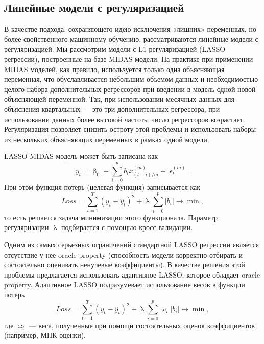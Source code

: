 \documentclass[a4paper, 12pt]{extarticle}
\numberwithin{equation}{subsection}
\renewcommand{\beta}{\upbeta}
\renewcommand{\lambda}{\uplambda}
\renewcommand{\omega}{\upomega}
\renewcommand{\epsilon}{\upvarepsilon}
\begin{document}
	\subsection{Линейные модели с регуляризацией}
	В качестве подхода, сохраняющего идею исключения «лишних» переменных, но более
	свойственного машинному обучению, рассматриваются линейные модели с регуляризацией.
	Мы рассмотрим модели с L1 регуляризацией (LASSO регрессии), построенные на базе MIDAS модели. На практике при применении
	MIDAS моделей, как правило, используется только одна объясняющая переменная, что обуславливается небольшим объемом данных и необходимостью целого набора дополнительных регрессоров при введении в модель одной новой объясняющей переменной. Так, при
	использовании месячных данных для объяснения квартальных --- это три дополнительных
	регрессора, при использовании данных более высокой частоты число регрессоров возрастает. Регуляризация позволяет снизить остроту этой проблемы и использовать наборы из нескольких объясняющих переменных в рамках одной модели.
	
	LASSO-MIDAS модель может быть записана как
	\begin{equation}
		y_t = \beta_0 + \sum_{i=0}^{p} b_i x_{(t-i)/m}^{(m)} + \epsilon_t^{(m)}.
	\end{equation}
	При этом функция потерь (целевая функция) записывается как \begin{equation}
		Loss = \sum_{t=1}^{T}(y_t - \hat{y}_t)^2 +\lambda \sum_{i=0}^{p}|b_i| \to \min,
	\end{equation}
	то есть решается задача минимизации этого функционала.
	Параметр регуляризации $\lambda$ подбирается с помощью кросс-валидации.
	
	Одним из самых серьезных ограничений стандартной LASSO регрессии является отсутствие у нее oracle property (способность модели корректно отбирать и состоятельно оценивать ненулевые коэффициенты). В качестве решения этой
	проблемы предлагается использовать адаптивное LASSO, которое обладает oracle property. Адаптивное LASSO подразумевает использование весов в функции потерь 
	\begin{equation}
		Loss = \sum_{t=1}^{T}(y_t - \hat{y}_t)^2 +\lambda \sum_{i=0}^{p}\omega_i|b_i| \to \min,
	\end{equation}
	где $\omega_i$ --- веса, полученные при помощи состоятельных оценок коэффициентов (например, МНК-оценки).
\end{document}
